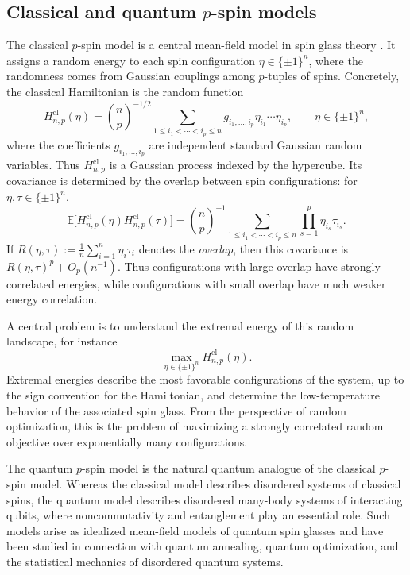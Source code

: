 \documentclass[12pt]{article}
\begin{document}
\begin{appendix}
\subsection{Classical and quantum \(p\)-spin models}
\label{ssec:classical-quantum-p-spin-background}
The classical \(p\)-spin model is a central mean-field model in spin glass theory \cite{MezardMontanariBook, TalagrandBook, panchenko2013Sherrington}. It assigns a random energy to each spin configuration \(\eta\in\{\pm1\}^n\), where the randomness comes from Gaussian couplings among \(p\)-tuples of spins. Concretely, the classical Hamiltonian is the random
function
\[
H_{n,p}^{\mathrm{cl}}(\eta)
=
\binom{n}{p}^{-1/2}
\sum_{1\le i_1<\cdots<i_p\le n}
g_{i_1,\ldots,i_p}
\eta_{i_1}\cdots \eta_{i_p},
\qquad
\eta\in\{\pm1\}^n,
\]
where the coefficients \(g_{i_1,\ldots,i_p}\) are independent standard
Gaussian random variables. Thus \(H_{n,p}^{\mathrm{cl}}\) is a Gaussian process
indexed by the hypercube. Its covariance is determined by the overlap between
spin configurations: for \(\eta,\tau\in\{\pm1\}^n\),
\[
    \mathbb E\bigl[
        H_{n,p}^{\mathrm{cl}}(\eta)
        H_{n,p}^{\mathrm{cl}}(\tau)
    \bigr]
    =
    \binom np^{-1}
    \sum_{1\le i_1<\cdots<i_p\le n}
    \prod_{s=1}^p \eta_{i_s}\tau_{i_s}.
\]
If $R(\eta,\tau):=\frac1n\sum_{i=1}^n \eta_i\tau_i$ denotes the \textit{overlap}, then this covariance is \(R(\eta,\tau)^p+O_p(n^{-1})\). Thus configurations with large overlap have
strongly correlated energies, while configurations with small overlap have
much weaker energy correlation.

A central problem is to understand the extremal energy of this random
landscape, for instance
\[
    \max_{\eta\in\{\pm1\}^n} H_{n,p}^{\mathrm{cl}}(\eta).
\]
Extremal energies describe the most favorable configurations of the system,
up to the sign convention for the Hamiltonian, and determine the low-temperature
behavior of the associated spin glass. From the perspective of random
optimization, this is the problem of maximizing a strongly correlated random
objective over exponentially many configurations.

The quantum \(p\)-spin model \cite{das2008colloquium, sachdev1999quantum, anschuetz2025bounds} is the natural quantum analogue of the classical
\(p\)-spin model. Whereas the classical model describes disordered systems of classical spins, the quantum model describes disordered many-body systems of interacting qubits, where
noncommutativity and entanglement play an essential role. Such models arise as
idealized mean-field models of quantum spin glasses and have been studied in
connection with quantum annealing, quantum optimization, and the statistical
mechanics of disordered quantum systems.


\end{appendix}
\end{document}
